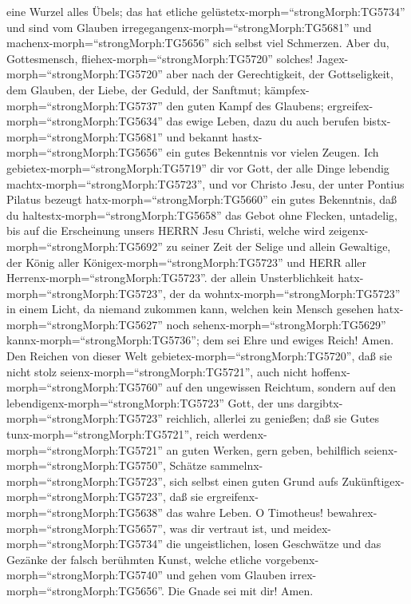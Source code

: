 eine Wurzel alles Übels; das hat etliche
gelüstetx-morph=``strongMorph:TG5734'' und sind vom Glauben
irregegangenx-morph=``strongMorph:TG5681'' und
machenx-morph=``strongMorph:TG5656'' sich selbst viel Schmerzen.
 Aber du, Gottesmensch,
fliehex-morph=``strongMorph:TG5720'' solches!
Jagex-morph=``strongMorph:TG5720'' aber nach der Gerechtigkeit, der
Gottseligkeit, dem Glauben, der Liebe, der Geduld, der Sanftmut;
 kämpfex-morph=``strongMorph:TG5737'' den guten Kampf des
Glaubens; ergreifex-morph=``strongMorph:TG5634'' das ewige Leben, dazu
du auch berufen bistx-morph=``strongMorph:TG5681'' und bekannt
hastx-morph=``strongMorph:TG5656'' ein gutes Bekenntnis vor vielen
Zeugen.  Ich gebietex-morph=``strongMorph:TG5719'' dir vor
Gott, der alle Dinge lebendig machtx-morph=``strongMorph:TG5723'', und
vor Christo Jesu, der unter Pontius Pilatus bezeugt
hatx-morph=``strongMorph:TG5660'' ein gutes Bekenntnis, 
daß du haltestx-morph=``strongMorph:TG5658'' das Gebot ohne Flecken,
untadelig, bis auf die Erscheinung unsers HERRN Jesu Christi,
 welche wird zeigenx-morph=``strongMorph:TG5692'' zu seiner
Zeit der Selige und allein Gewaltige, der König aller
Königex-morph=``strongMorph:TG5723'' und HERR aller
Herrenx-morph=``strongMorph:TG5723''.  der allein
Unsterblichkeit hatx-morph=``strongMorph:TG5723'', der da
wohntx-morph=``strongMorph:TG5723'' in einem Licht, da niemand zukommen
kann, welchen kein Mensch gesehen hatx-morph=``strongMorph:TG5627'' noch
sehenx-morph=``strongMorph:TG5629'' kannx-morph=``strongMorph:TG5736'';
dem sei Ehre und ewiges Reich! Amen.  Den Reichen von
dieser Welt gebietex-morph=``strongMorph:TG5720'', daß sie nicht stolz
seienx-morph=``strongMorph:TG5721'', auch nicht
hoffenx-morph=``strongMorph:TG5760'' auf den ungewissen Reichtum,
sondern auf den lebendigenx-morph=``strongMorph:TG5723'' Gott, der uns
dargibtx-morph=``strongMorph:TG5723'' reichlich, allerlei zu genießen;
 daß sie Gutes tunx-morph=``strongMorph:TG5721'', reich
werdenx-morph=``strongMorph:TG5721'' an guten Werken, gern geben,
behilflich seienx-morph=``strongMorph:TG5750'',  Schätze
sammelnx-morph=``strongMorph:TG5723'', sich selbst einen guten Grund
aufs Zukünftigex-morph=``strongMorph:TG5723'', daß sie
ergreifenx-morph=``strongMorph:TG5638'' das wahre Leben.  O
Timotheus! bewahrex-morph=``strongMorph:TG5657'', was dir vertraut ist,
und meidex-morph=``strongMorph:TG5734'' die ungeistlichen, losen
Geschwätze und das Gezänke der falsch berühmten Kunst, 
welche etliche vorgebenx-morph=``strongMorph:TG5740'' und gehen vom
Glauben irrex-morph=``strongMorph:TG5656''. Die Gnade sei mit dir! Amen.
